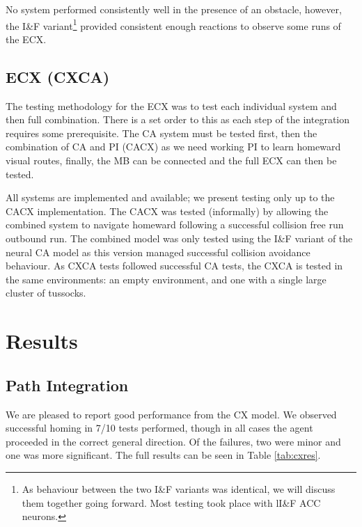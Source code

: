 \documentclass[a4paper,11pt,twoside,openright]{article}
\let\oldsection\section
\def\section{\cleardoublepage\oldsection}
\begin{document}
No system performed consistently well in the presence of an obstacle,
however, the I\&F variant\footnote{As behaviour between the two I\&F
  variants was identical, we will discuss them together going
  forward. Most testing took place with lI\&F ACC neurons.} provided
consistent enough reactions to observe some runs of the ECX.

\subsection{ECX (CXCA)}
The testing methodology for the ECX was to test each individual system
and then full combination. There is a set order to this as each step
of the integration requires some prerequisite. The CA system must be
tested first, then the combination of CA and PI (CACX) as we need
working PI to learn homeward visual routes, finally, the MB can be
connected and the full ECX can then be tested.
\newline\par

All systems are implemented and available; we present testing only up
to the CACX implementation. The CACX was tested (informally) by
allowing the combined system to navigate homeward following a
successful collision free run outbound run. The combined model was
only tested using the I\&F variant of the neural CA model as this
version managed successful collision avoidance behaviour. As CXCA
tests followed successful CA tests, the CXCA is tested in the same
environments: an empty environment, and one with a single large
cluster of tussocks.


\section{ Results } \label{sec:results}
\subsection{ Path Integration }
We are pleased to report good performance from the CX model. We
observed successful homing in 7/10 tests performed, though in all
cases the agent proceeded in the correct general direction. Of the
failures, two were minor and one was more significant. The full
results can be seen in Table \ref{tab:cxres}.
\newline
\par
\end{document}
